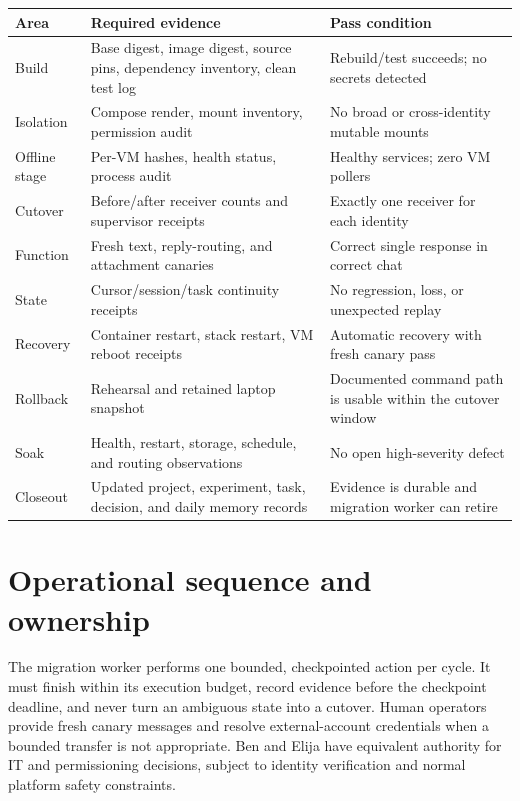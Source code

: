 \documentclass[11pt]{article}
\begin{document}
\begin{longtable}{p{}p{}p{}}
\toprule
Area & Required evidence & Pass condition \\
\midrule
Build & Base digest, image digest, source pins, dependency inventory, clean test
log & Rebuild/test succeeds; no secrets detected \\
Isolation & Compose render, mount inventory, permission audit & No broad or
cross-identity mutable mounts \\
Offline stage & Per-VM hashes, health status, process audit & Healthy services;
zero VM pollers \\
Cutover & Before/after receiver counts and supervisor receipts & Exactly one
receiver for each identity \\
Function & Fresh text, reply-routing, and attachment canaries & Correct single
response in correct chat \\
State & Cursor/session/task continuity receipts & No regression, loss, or
unexpected replay \\
Recovery & Container restart, stack restart, VM reboot receipts & Automatic
recovery with fresh canary pass \\
Rollback & Rehearsal and retained laptop snapshot & Documented command path is
usable within the cutover window \\
Soak & Health, restart, storage, schedule, and routing observations & No open
high-severity defect \\
Closeout & Updated project, experiment, task, decision, and daily memory records
& Evidence is durable and migration worker can retire \\
\bottomrule
\end{longtable}

\section{Operational sequence and ownership}

The migration worker performs one bounded, checkpointed action per cycle. It
must finish within its execution budget, record evidence before the checkpoint
deadline, and never turn an ambiguous state into a cutover. Human operators
provide fresh canary messages and resolve external-account credentials when a
bounded transfer is not appropriate. Ben and Elija have equivalent authority
for IT and permissioning decisions, subject to identity verification and normal
platform safety constraints.
\end{document}
